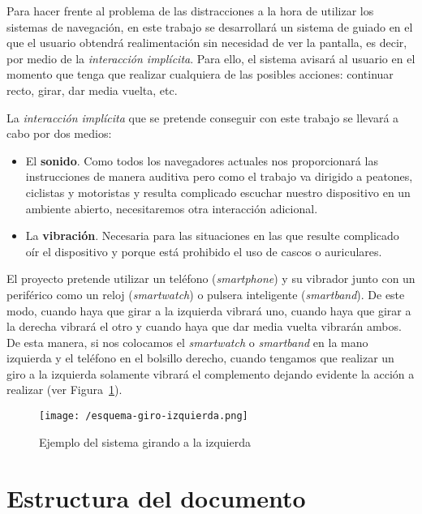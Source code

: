 Para hacer frente al problema de las distracciones a la hora de utilizar los sistemas de navegación,
en este trabajo se desarrollará un sistema de guiado en el que el usuario obtendrá realimentación
sin necesidad de ver la pantalla, es decir, por medio de la \emph{interacción implícita}. Para ello,
el sistema avisará al usuario en el momento que tenga que realizar cualquiera de las posibles
acciones: continuar recto, girar, dar media vuelta, etc.

La \emph{interacción implícita} que se pretende conseguir con este trabajo se llevará a cabo por dos
medios:
\begin{itemize}
  \item El \textbf{sonido}. Como todos los navegadores actuales nos proporcionará las instrucciones
    de manera auditiva pero como el trabajo va dirigido a peatones, ciclistas y motoristas y resulta
    complicado escuchar nuestro dispositivo en un ambiente abierto, necesitaremos otra interacción
    adicional.
  \item La \textbf{vibración}. Necesaria para las situaciones en las que resulte complicado oír el
    dispositivo y porque está prohibido el uso de cascos o auriculares.
\end{itemize}

El proyecto pretende utilizar un teléfono (\emph{smartphone}) y su vibrador junto con un periférico
como un reloj (\emph{smartwatch}) o pulsera inteligente (\emph{smartband}). De este modo, cuando
haya que girar a la izquierda vibrará uno, cuando haya que girar a la derecha vibrará el otro y
cuando haya que dar media vuelta vibrarán ambos. De esta manera, si nos colocamos el
\emph{smartwatch} o \emph{smartband} en la mano izquierda y el teléfono en el bolsillo derecho,
cuando tengamos que realizar un giro a la izquierda solamente vibrará el complemento dejando
evidente la acción a realizar (ver Figura~\ref{fig:giroIzquierda}).

\begin{figure}[!h]
  \begin{center}
    \texttt{[image: /esquema-giro-izquierda.png]}
    \caption{Ejemplo del sistema girando a la izquierda}
    \label{fig:giroIzquierda}
  \end{center}
\end{figure}


\section{Estructura del documento}

